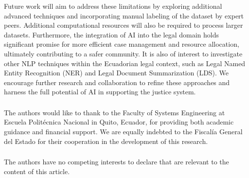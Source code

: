 \documentclass[runningheads]{llncs}
\begin{document}
Future work will aim to address these limitations by exploring
additional advanced techniques and incorporating manual labeling of
the dataset by expert peers. Additional computational resources will
also be required to process larger datasets. Furthermore, the
integration of AI into the legal domain holds significant promise for
more efficient case management and resource allocation, ultimately
contributing to a safer community. It is also of interest to
investigate other NLP techniques within the Ecuadorian legal context,
such as Legal Named Entity Recognition (NER) and Legal Document
Summarization (LDS). We encourage further research and collaboration
to refine these approaches and harness the full potential of AI in
supporting the justice system.



\begin{credits}
  \subsubsection{\ackname}
  The authors would like to thank to the Faculty of Systems
  Engineering at Escuela Politécnica Nacional in Quito, Ecuador, for
  providing both academic guidance and financial support. We are
  equally indebted to the Fiscalía General del Estado for their
  cooperation in the development of this research.

\subsubsection{\discintname}
The authors have no competing interests to declare that are relevant
to the content of this article.
\end{credits}
%
%
%


% 




\end{document}
